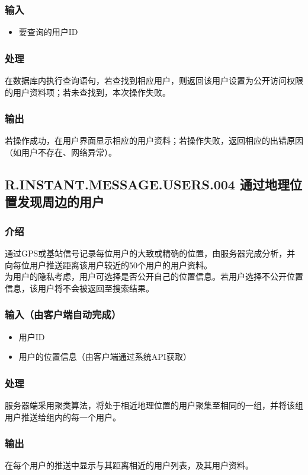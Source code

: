 \subsubsection{输入}
\begin{itemize}
	\item 要查询的用户ID
	\end{itemize}
\subsubsection{处理}
在数据库内执行查询语句，若查找到相应用户，则返回该用户{\color{red}设置为公开访问权限的}用户资料项；若未查找到，本次操作失败。
\subsubsection{输出}
若操作成功，在用户界面显示相应的用户资料；若操作失败，返回相应的出错原因（如用户不存在、网络异常）。


\subsection{R.INSTANT.MESSAGE.USERS.004 通过地理位置发现周边的用户}
\subsubsection{介绍}
通过GPS或基站信号记录每位用户的大致或精确的位置，由服务器完成分析，并向每位用户推送距离该用户较近的50个用户的用户资料。\\
{\color{red}为用户的隐私考虑，用户可选择是否公开自己的位置信息。若用户选择不公开位置信息，该用户将不会被返回至搜索结果。}
\subsubsection{输入（由客户端自动完成）}
\begin{itemize}
	\item 用户ID
	\item 用户的位置信息（由客户端通过系统API获取）
\end{itemize}
\subsubsection{处理}
服务器端采用聚类算法，将处于相近地理位置的用户聚集至相同的一组，并将该组用户推送给组内的每一个用户。
\subsubsection{输出}
在每个用户的推送中显示与其距离相近的用户列表，及其用户资料。


